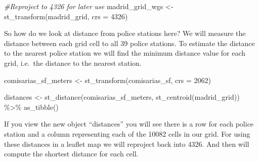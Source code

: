 \documentclass[
  krantz2]{krantz}
\makeatletter
\newenvironment{Shaded}{\begin{snugshade}}{\end{snugshade}}
\newcommand{\AttributeTok}[1]{\textcolor[rgb]{0.61,0.61,0.61}{#1}}
\newcommand{\CommentTok}[1]{\textcolor[rgb]{0.37,0.37,0.37}{\textit{#1}}}
\newcommand{\DecValTok}[1]{\textcolor[rgb]{0.06,0.06,0.06}{#1}}
\newcommand{\FunctionTok}[1]{\textcolor[rgb]{0,0,0}{#1}}
\newcommand{\NormalTok}[1]{#1}
\newcommand{\OtherTok}[1]{\textcolor[rgb]{0.37,0.37,0.37}{#1}}
\newcommand{\SpecialCharTok}[1]{\textcolor[rgb]{0,0,0}{#1}}
\newenvironment{kframe}{%
\medskip{}
\setlength{\fboxsep}{.8em}
 \def\at@end@of@kframe{}%
 \ifinner\ifhmode%
  \def\at@end@of@kframe{\end{minipage}}%
  \begin{minipage}{\columnwidth}%
 \fi\fi%
 \def\FrameCommand##1{\hskip\@totalleftmargin \hskip-\fboxsep
 \colorbox{shadecolor}{##1}\hskip-\fboxsep
     \hskip-\linewidth \hskip-\@totalleftmargin \hskip\columnwidth}%
 \MakeFramed {\advance\hsize-\width
   \@totalleftmargin\z@ \linewidth\hsize
   \@setminipage}}%
 {\par\unskip\endMakeFramed%
 \at@end@of@kframe}
\renewenvironment{Shaded}{\begin{kframe}}{\end{kframe}}
\makeatother
\begin{document}
\begin{Shaded}
\begin{Highlighting}[]
\CommentTok{\#Reproject to 4326 for later use}
\NormalTok{madrid\_grid\_wgs }\OtherTok{\textless{}{-}} \FunctionTok{st\_transform}\NormalTok{(madrid\_grid, }\AttributeTok{crs =} \DecValTok{4326}\NormalTok{)}
\end{Highlighting}
\end{Shaded}

So how do we look at distance from police stations here? We will measure the distance between each grid cell to all 39 police stations. To estimate the distance to the nearest police station we will find the minimum distance value for each grid, i.e.~the distance to the nearest station.

\begin{Shaded}
\begin{Highlighting}[]
\NormalTok{comisarias\_sf\_meters }\OtherTok{\textless{}{-}} \FunctionTok{st\_transform}\NormalTok{(comisarias\_sf, }\AttributeTok{crs =} \DecValTok{2062}\NormalTok{)}

\NormalTok{distances }\OtherTok{\textless{}{-}} \FunctionTok{st\_distance}\NormalTok{(comisarias\_sf\_meters, }
                         \FunctionTok{st\_centroid}\NormalTok{(madrid\_grid)) }\SpecialCharTok{\%\textgreater{}\%} 
  \FunctionTok{as\_tibble}\NormalTok{()}
\end{Highlighting}
\end{Shaded}

If you view the new object ``distances'' you will see there is a row for each police station and a column representing each of the 10082 cells in our grid. For using these distances in a leaflet map we will reproject back into 4326. And then will compute the shortest distance for each cell.
\end{document}
